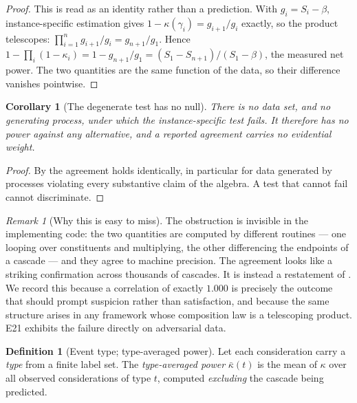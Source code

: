\documentclass[11pt,a4paper]{article}
\theoremstyle{clstyle}
\newtheorem{corollary}[theorem]{Corollary}
\theoremstyle{definition}
\newtheorem{definition}[theorem]{Definition}
\theoremstyle{remark}
\newtheorem{remark}[theorem]{Remark}
\newcommand{\flo}{\beta}
\begin{document}
\begin{proof}
This is  read as an identity rather than a
prediction. With $g_i=S_i-\flo$, instance-specific estimation gives
$1-\kappa(\gamma_i)=g_{i+1}/g_i$ exactly, so the product telescopes:
$\prod_{i=1}^{n}g_{i+1}/g_i=g_{n+1}/g_1$. Hence
$1-\prod_i(1-\kappa_i)=1-g_{n+1}/g_1=(S_1-S_{n+1})/(S_1-\flo)$, the measured
net power. The two quantities are the same function of the data, so their
difference vanishes pointwise.
\end{proof}

\begin{corollary}[The degenerate test has no null]
\label{cor:no-null}
There is no data set, and no generating process, under which the
instance-specific test fails. It therefore has no power against any
alternative, and a reported agreement carries no evidential weight.
\end{corollary}

\begin{proof}
By  the agreement holds identically, in particular for
data generated by processes violating every substantive claim of the algebra.
A test that cannot fail cannot discriminate.
\end{proof}

\begin{remark}[Why this is easy to miss]
\label{rem:easy-miss}
The obstruction is invisible in the implementing code: the two quantities are
computed by different routines --- one looping over constituents and
multiplying, the other differencing the endpoints of a cascade --- and they
agree to machine precision. The agreement looks like a striking confirmation
across thousands of cascades. It is instead a restatement of
. We record this because a correlation of exactly
$1.000$ is precisely the outcome that should prompt suspicion rather than
satisfaction, and because the same structure arises in any framework whose
composition law is a telescoping product. E21 exhibits the failure directly
on adversarial data.
\end{remark}

\begin{definition}[Event type; type-averaged power]
\label{def:typeavg}
Let each consideration carry a \emph{type} from a finite label set. The
\emph{type-averaged power} $\bar\kappa(t)$ is the mean of $\kappa$ over all
observed considerations of type $t$, computed \emph{excluding} the cascade
being predicted.
\end{definition}
\end{document}
